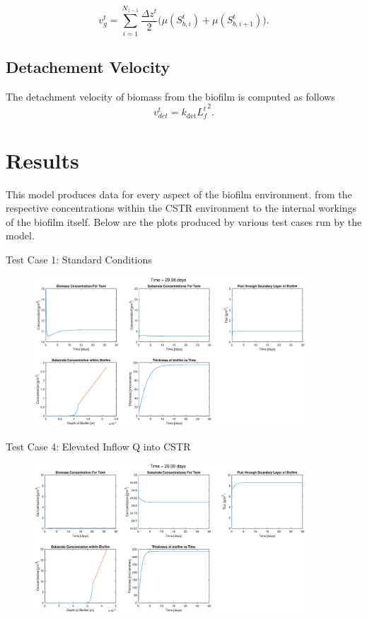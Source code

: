 \documentclass[letterpaper, twoside]{article}
\numberwithin{equation}{section}
\begin{document}
\begin{equation}
  \label{eq:vg_sum}
  {v_g^{t}}={\sum_{i=1}^{N_{z-1}}  {\frac{\Delta {z^{t}}}{2}}  ( {\mu({S_{b,i}^{t}})+\mu({S_{b,i+1}^{t}})}}).
\end{equation}

\subsection{Detachement Velocity}
The detachment velocity of biomass from the biofilm is computed as follows
\begin{equation}
  \label{eq:vdet2}
  {v_{det}^{t}}={k_{\mathrm{det}}{L^t_f}^2}.
\end{equation}

\section{Results}
This model produces data for every aspect of the biofilm environment. from the respective concentrations within the CSTR environment to the internal workings of the biofilm itself. Below are the plots produced by various test cases run by the model.

Test Case 1: Standard Conditions
\begin{figure}[H]
  \centering
  \includegraphics[read=eps, width=4in]{Testcase1_figure.eps}
\end{figure}

Test Case 4: Elevated Inflow Q into CSTR
\begin{figure}[H]
  \centering
  \includegraphics[read=eps, width=4in]{Testcase4_figure.eps}
\end{figure}
\end{document}
